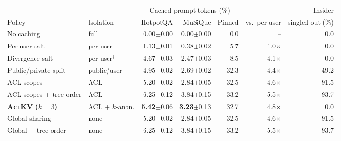 \begin{tabular}{@{}l l r r r r r@{}}
\toprule
 & & \multicolumn{3}{c}{Cached prompt tokens (\%)} & & Insider \\ \cmidrule(lr){3-5}
Policy & Isolation & HotpotQA & MuSiQue & Pinned & vs.\ per-user & singled-out (\%) \\
\midrule
No caching & full & 0.00$\pm$0.00 & 0.00$\pm$0.00 & 0.0 & -- & 0.0 \\
Per-user salt & per user & 1.13$\pm$0.01 & 0.38$\pm$0.02 & 5.7 & 1.0$\times$ & 0.0 \\
Divergence salt & per user$^{\dagger}$ & 4.67$\pm$0.03 & 2.47$\pm$0.03 & 8.5 & 4.1$\times$ & 0.0 \\
Public/private split & public/user & 4.95$\pm$0.02 & 2.69$\pm$0.02 & 32.3 & 4.4$\times$ & 49.2 \\
ACL scopes & ACL & 5.20$\pm$0.02 & 2.84$\pm$0.05 & 32.5 & 4.6$\times$ & 91.5 \\
ACL scopes + tree order & ACL & 6.25$\pm$0.12 & 3.84$\pm$0.15 & 33.2 & 5.5$\times$ & 93.7 \\
\textbf{\textsc{AclKV} ($k{=}3$)} & ACL + $k$-anon. & \textbf{5.42}$\pm$0.06 & \textbf{3.23}$\pm$0.13 & 32.7 & 4.8$\times$ & 0.0 \\
\midrule
Global sharing & none & 5.20$\pm$0.02 & 2.84$\pm$0.05 & 32.5 & 4.6$\times$ & 91.5 \\
Global + tree order & none & 6.25$\pm$0.12 & 3.84$\pm$0.15 & 33.2 & 5.5$\times$ & 93.7 \\
\bottomrule
\end{tabular}
